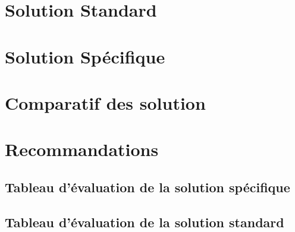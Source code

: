 

\newcommand{\mainTitle}{\'Etude préalable - SPIE}
\newcommand{\secondTitle}{Dossier d'évaluation des solutions}
\newcommand{\documentRef}{DC/4401/1}
\newcommand{\auteurs}{
Lisa \textsc{Courant} \\
Estelle \textsc{Lepeigneux} \\
Pierre \textsc{Jarsaillon} \\
Hugues \textsc{Verlin} \\
}
\newcommand{\chefDeProjet}{Paul \textsc{Dautry}}
\newcommand{\responsableQualite}{Antoine \textsc{Chabert}}




\newpage

\tableofcontents
\newpage

\part{Solution Standard}
\setcounter{section}{0}


\part{Solution Spécifique}
\setcounter{section}{0}


\part{Comparatif des solution}
\setcounter{section}{0}


\part{Recommandations}
\setcounter{section}{0}


\appendix

\chapter{Tableau d'évaluation de la solution spécifique}


\chapter{Tableau d'évaluation de la solution standard}




